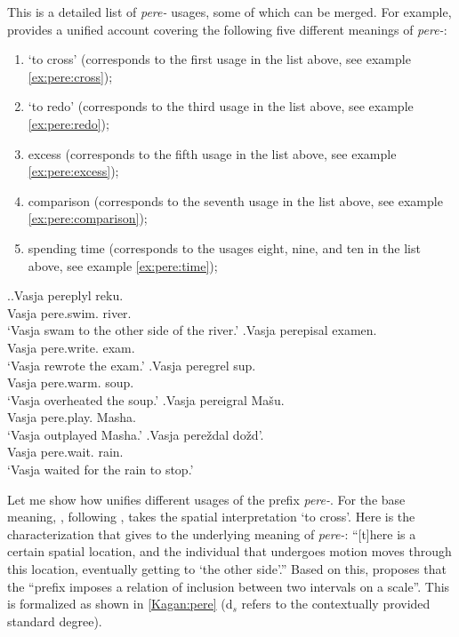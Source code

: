 This is a detailed list of \textit{pere-} usages, some of which can be merged. For example, \citet[119--125]{Kagan:book} provides a unified account covering the following five different meanings of \textit{pere-}: 
\begin{enumerate}
\item `to cross' (corresponds to the first usage in the list above, see example \ref{ex:pere:cross});
\item `to redo' (corresponds to the third usage in the list above, see example \ref{ex:pere:redo});
\item excess (corresponds to the fifth usage in the list above, see example \ref{ex:pere:excess});
\item comparison (corresponds to the seventh usage in the list above, see example \ref{ex:pere:comparison});
\item spending time (corresponds to the usages eight, nine, and ten in the list above, see example \ref{ex:pere:time});
\end{enumerate}

\ex.\label{ex:pere}\ag.\label{ex:pere:cross}Vasja pereplyl reku.\\
Vasja pere.swim. river.\\
\vspace{0.5em}
`Vasja swam to the other side of the river.'
\bg.\label{ex:pere:redo}Vasja perepisal examen.\\
Vasja pere.write. exam.\\
\vspace{0.5em}
`Vasja rewrote the exam.'
\bg.\label{ex:pere:excess}Vasja peregrel sup.\\
Vasja pere.warm. soup.\\
\vspace{0.5em}
`Vasja overheated the soup.'
\bg.\label{ex:pere:comparison}Vasja pereigral Ma\v{s}u.\\
Vasja pere.play. Masha.\\
\vspace{0.5em}
`Vasja outplayed Masha.'
\bg.\label{ex:pere:time}Vasja pere\v{z}dal do\v{z}d'.\\
Vasja pere.wait. rain.\\
\vspace{0.5em}
`Vasja waited for the rain to stop.'

Let me show how \citet{Kagan:book} unifies different usages of the prefix \textit{pere-}. For the base meaning, \citet[120--121]{Kagan:book}, following \citet{Janda:88}, takes the spatial interpretation `to cross'. Here is the characterization that \citet[121]{Kagan:book} gives to the underlying meaning of \textit{pere-}: ``[t]here is a certain spatial location, and the individual that undergoes motion moves through this location, eventually getting to `the other side'.'' Based on this, \citet[122]{Kagan:book} proposes that the ``prefix imposes a relation of inclusion between two intervals on a scale''. This is formalized as shown in \ref{Kagan:pere} (d$_s$ refers to the contextually provided standard degree).

